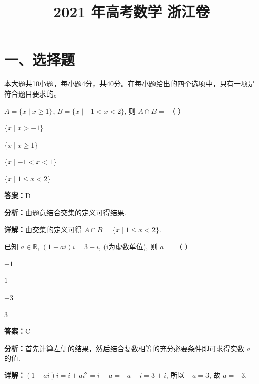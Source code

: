 ﻿\title{2021 年高考数学 浙江卷}
\date{}
\maketitle

\section*{一、选择题}
本大题共10小题，每小题4分，共40分。在每小题给出的四个选项中，只有一项是符合题目要求的。

\begin{question}[points=4]
$A = \{x \mid x \geq 1\}$, $B = \{x \mid -1 < x < 2\}$, 则 $A \cap B =$ （   ）
\begin{choices}
  \item $\{x \mid x > -1\}$
  \item $\{x \mid x \geq 1\}$
  \item $\{x \mid -1 < x < 1\}$
  \item $\{x \mid 1 \leq x < 2\}$
\end{choices}
\begin{solution}
\textbf{答案：}D

\textbf{分析：}由题意结合交集的定义可得结果.

\textbf{详解：}由交集的定义可得 $A \cap B = \{x \mid 1 \leq x < 2\}$.
\end{solution}
\end{question}

\begin{question}[points=4]
已知 $a \in \mathbb{R}$, $(1+ai)i=3+i$, (i为虚数单位), 则 $a=$ （   ）
\begin{choices}
  \item $-1$
  \item $1$
  \item $-3$
  \item $3$
\end{choices}
\begin{solution}
\textbf{答案：}C

\textbf{分析：}首先计算左侧的结果，然后结合复数相等的充分必要条件即可求得实数 $a$ 的值.

\textbf{详解：}$(1+ai)i = i + ai^2 = i - a = -a + i = 3 + i$, 所以 $-a=3$, 故 $a=-3$.
\end{solution}
\end{question}

